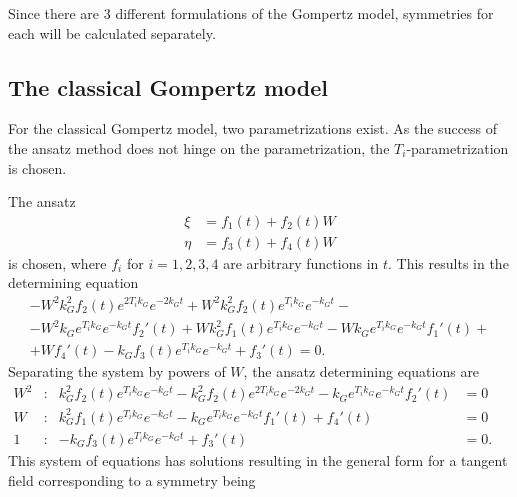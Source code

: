 Since there are 3 different formulations of the Gompertz model, symmetries for each will be calculated separately.

\subsection{The classical Gompertz model}

For the classical Gompertz model, two parametrizations exist.
As the success of the ansatz method does not hinge on the parametrization, the \(T_i\)-parametrization is chosen.

The ansatz
\begin{align*}
  \xi &= f_{1}(t) + f_{2}(t) W \\
  \eta &= f_{3}(t) + f_{4}(t) W
\end{align*}
is chosen, where \(f_i\) for \(i =1,2,3,4\) are arbitrary functions in \(t\).
This results in the determining equation
\begin{multline*}
  - W^{2} k_{G}^{2} f_{2}{\left(t \right)} e^{2 T_{i} k_{G}} e^{- 2 k_{G} t} + W^{2} k_{G}^{2} f_{2}{\left(t \right)} e^{T_{i} k_{G}} e^{- k_{G} t} -\\- W^{2} k_{G} e^{T_{i} k_{G}} e^{- k_{G} t} f_{2}'{\left(t \right)} + W k_{G}^{2} f_{1}{\left(t \right)} e^{T_{i} k_{G}} e^{- k_{G} t} - W k_{G} e^{T_{i} k_{G}} e^{- k_{G} t} f_{1}'{\left(t \right)} +\\+ W f_{4}'{\left(t \right)} - k_{G} f_{3}{\left(t \right)} e^{T_{i} k_{G}} e^{- k_{G} t} + f_{3}'{\left(t \right)} = 0.
\end{multline*}
Separating the system by powers of \(W\), the ansatz determining equations are
\begin{subequations}
  \begin{flalign*}
    W^2 & : &  k_{G}^{2} f_{2}{\left(t \right)} e^{T_{i} k_{G}} e^{- k_{G} t} - k_{G}^{2} f_{2}{\left(t \right)} e^{2 T_{i} k_{G}} e^{- 2 k_{G} t} - k_{G} e^{T_{i} k_{G}} e^{- k_{G} t} f_{2}'{\left(t \right)} &= 0 &&\\
    W & : & k_{G}^{2} f_{1}{\left(t \right)} e^{T_{i} k_{G}} e^{- k_{G} t} - k_{G} e^{T_{i} k_{G}} e^{- k_{G} t} f_{1}'{\left(t \right)} + f_{4}'{\left(t \right)} &= 0 && \\
    1 & : & - k_{G} f_{3}{\left(t \right)} e^{T_{i} k_{G}} e^{- k_{G} t} + f_{3}'{\left(t \right)} &= 0. &&
  \end{flalign*}
\end{subequations}
This system of equations has solutions resulting in the general form for a tangent field corresponding to a symmetry being

